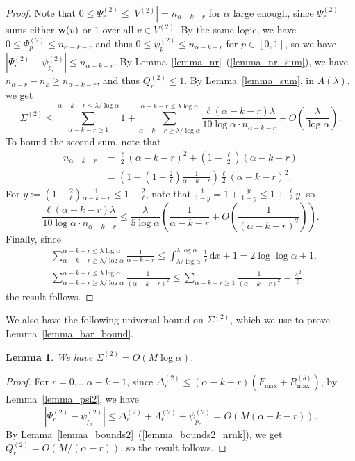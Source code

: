 \documentclass{article}
\theoremstyle{plain}
\theoremstyle{remark}
\theoremstyle{plain}
\newtheorem{lemma}[theorem]{Lemma}
\numberwithin{equation}{section}
\renewcommand{\b}{{\bf{w}}}
\begin{document}
	\begin{proof}
		Note that $0\leq\Psi_r^{(2)}\leq|V^{(2)}|=n_{\alpha-k-r}$ for $\alpha$ large enough, since $\Psi_r^{(2)}$ sums either $\b(v)$ or $1$ over all $v\in V^{(2)}$. By the same logic, we have $0\leq\Psi_p^{(2)}\leq n_{\alpha-k-r}$ and thus $0\leq\psi_p^{(2)}\leq n_{\alpha-k-r}$ for $p\in[0,1]$, so we have $|\Psi_r^{(2)}-\psi_{p_r}^{(2)}|\leq n_{\alpha-k-r}$. By Lemma~\ref{lemma_nr}~(\ref{lemma_nr_sum}), we have $n_{\alpha-r}-n_k\geq n_{\alpha-k-r}$, and thus $Q_r^{(2)}\leq1$. By Lemma~\ref{lemma_sum}, in $A(\lambda)$, we get $$\Sigma^{(2)}\leq\sum_{\alpha-k-r\geq1}^{\alpha-k-r\leq\lambda/\log\alpha}1+\sum_{\alpha-k-r\geq\lambda/\log\alpha}^{\alpha-k-r\leq\lambda\log\alpha}\frac{\ell(\alpha-k-r)\lambda}{10\log\alpha\cdot n_{\alpha-k-r}}+O\left(\frac{\lambda}{\log\alpha}\right).$$ To bound the second sum, note that
		\begin{align}
			n_{\alpha-k-r}
			&=\tfrac{\ell}{2}(\alpha-k-r)^2+(1-\tfrac{\ell}{2})(\alpha-k-r)
			\\&=(1-(1-\tfrac{2}{\ell})\tfrac{1}{\alpha-k-r})\tfrac{\ell}{2}(\alpha-k-r)^2.
		\end{align}
		For $y:=(1-\tfrac{2}{\ell})\tfrac{1}{\alpha-k-r}\leq1-\tfrac{2}{\ell}$, note that $\tfrac{1}{1-y}=1+\tfrac{y}{1-y}\leq1+\tfrac{\ell}{2}y$, so $$\frac{\ell(\alpha-k-r)\lambda}{10\log\alpha\cdot n_{\alpha-k-r}}\leq\frac{\lambda}{5\log\alpha}\left(\frac1{\alpha-k-r}+O\left(\frac{1}{(\alpha-k-r)^2}\right)\right).$$ Finally, since
		\begin{align}
			&\sum_{\alpha-k-r\geq\lambda/\log\alpha}^{\alpha-k-r\leq\lambda\log\alpha}\frac1{\alpha-k-r}\leq\int_{\lambda/\log\alpha}^{\lambda\log\alpha}\frac1x\,\mathrm{d}x+1=2\log\log\alpha+1,
			\\&\sum_{\alpha-k-r\geq\lambda/\log\alpha}^{\alpha-k-r\leq\lambda\log\alpha}\frac1{(\alpha-k-r)^2}\leq\sum_{\alpha-k-r\geq1}\frac{1}{(\alpha-k-r)^2}=\frac{\pi^2}{6},
		\end{align}
		the result follows.
	\end{proof}
	
	We also have the following universal bound on $\Sigma^{(2)}$, which we use to prove Lemma~\ref{lemma_bar_bound}.
	
	\begin{lemma}\label{lemma_universal}
		We have $\Sigma^{(2)}=O(M\log\alpha)$.
	\end{lemma}
	
	\begin{proof}
		For $r=0,\ldots\alpha-k-1$, since $\Delta_r^{(2)}\leq(\alpha-k-r)(F_{\max}+R_{\max}^{(b)})$, by Lemma~\ref{lemma_psi2}, we have $$|\Psi_r^{(2)}-\psi_{p_r}^{(2)}|\leq\Delta_r^{(2)}+\Lambda_r^{(2)}+\psi_{p_r}^{(2)}=O(M(\alpha-k-r)).$$ By Lemma~\ref{lemma_bounds2}~(\ref{lemma_bounds2_nrnk}), we get $Q_r^{(2)}=O(M/(\alpha-r))$, so the result follows.
	\end{proof}
	
\end{document}

